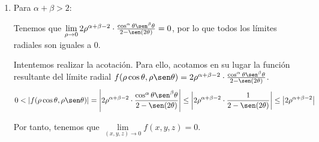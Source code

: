 \begin{ejercicio}
\begin{enumerate}
        \item Para $\alpha+\beta>2$:

        Tenemos que $\lim\limits_{\rho\to 0} 2\rho^{\alpha+\beta-2} \cdot \frac{\cos^\alpha\theta \sen^\beta\theta}{2 -\sen(2\theta)}=0$, por lo que todos los límites radiales son iguales a 0.

        Intentemos realizar la acotación. Para ello, acotamos en su lugar la función resultante del límite radial $f(\rho \cos \theta, \rho \sen \theta)=2\rho^{\alpha+\beta-2} \cdot \frac{\cos^\alpha\theta \sen^\beta\theta}{2 -\sen(2\theta)}$.
         \begin{equation*}
             0<|f(\rho \cos \theta, \rho \sen \theta)|
             =\left|2\rho^{\alpha+\beta-2} \cdot \frac{\cos^\alpha\theta \sen^\beta\theta}{2 -\sen(2\theta)}\right|\leq 
             \left|2\rho^{\alpha+\beta-2} \cdot \frac{1}{2 -\sen(2\theta)}\right|
             \leq 
             \left|2\rho^{\alpha+\beta-2}\right|
         \end{equation*}

         Por tanto, tenemos que $\lim\limits_{(x,y,z)\to 0}f(x,y,z)=0$.
    \end{enumerate}
\end{ejercicio}

